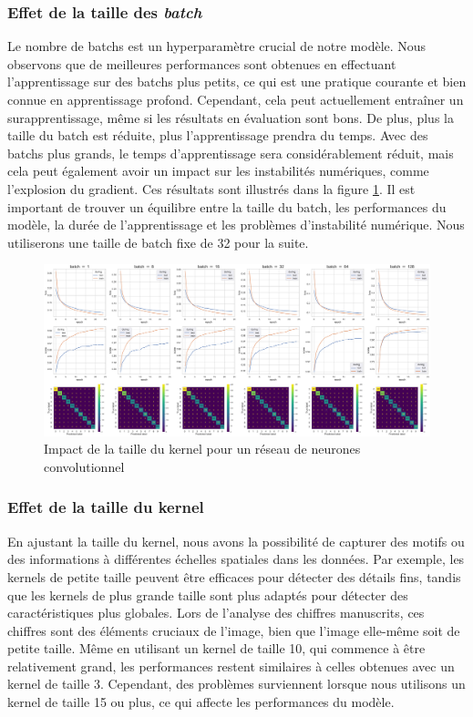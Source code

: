 \documentclass{article}
\begin{document}
\subsubsection{Effet de la taille des \textit{batch}}

Le nombre de batchs est un hyperparamètre crucial de notre modèle. Nous observons que de meilleures performances sont obtenues en effectuant l'apprentissage sur des batchs plus petits, ce qui est une pratique courante et bien connue en apprentissage profond. Cependant, cela peut actuellement entraîner un surapprentissage, même si les résultats en évaluation sont bons. De plus, plus la taille du batch est réduite, plus l'apprentissage prendra du temps. Avec des batchs plus grands, le temps d'apprentissage sera considérablement réduit, mais cela peut également avoir un impact sur les instabilités numériques, comme l'explosion du gradient. Ces résultats sont illustrés dans la figure \ref{fig:conv_batch}. Il est important de trouver un équilibre entre la taille du batch, les performances du modèle, la durée de l'apprentissage et les problèmes d'instabilité numérique. Nous utiliserons une taille de batch fixe de 32 pour la suite.


\begin{figure}[htbp]
    \centering
    \includegraphics[width=\textwidth]{conv/conv_batch.pdf}
    \caption{Impact de la taille du kernel pour un réseau de neurones convolutionnel}
    \label{fig:conv_batch}
\end{figure}

\subsubsection{Effet de la taille du kernel}

En ajustant la taille du kernel, nous avons la possibilité de capturer des motifs ou des informations à différentes échelles spatiales dans les données. Par exemple, les kernels de petite taille peuvent être efficaces pour détecter des détails fins, tandis que les kernels de plus grande taille sont plus adaptés pour détecter des caractéristiques plus globales. Lors de l'analyse des chiffres manuscrits, ces chiffres sont des éléments cruciaux de l'image, bien que l'image elle-même soit de petite taille. Même en utilisant un kernel de taille 10, qui commence à être relativement grand, les performances restent similaires à celles obtenues avec un kernel de taille 3. Cependant, des problèmes surviennent lorsque nous utilisons un kernel de taille 15 ou plus, ce qui affecte les performances du modèle.
\end{document}
